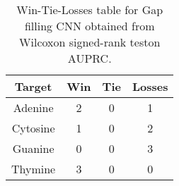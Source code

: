 \begin{table}[H]
\centering
\begin{tabular}{|c|c|c|c|}

\textbf{Target} &  \textbf{Win} &  \textbf{Tie} &  \textbf{Losses} \\
\hline

        Adenine &             2 &             0 &                1 \\
\hline
       Cytosine &             1 &             0 &                2 \\
\hline
        Guanine &             0 &             0 &                3 \\
\hline
        Thymine &             3 &             0 &                0 \\
\hline

\end{tabular}
\caption{Win-Tie-Losses table for Gap filling CNN obtained from Wilcoxon signed-rank teston AUPRC.}
\label{tab:gap_filling_cnn_nucleotides_comparison}
\end{table}